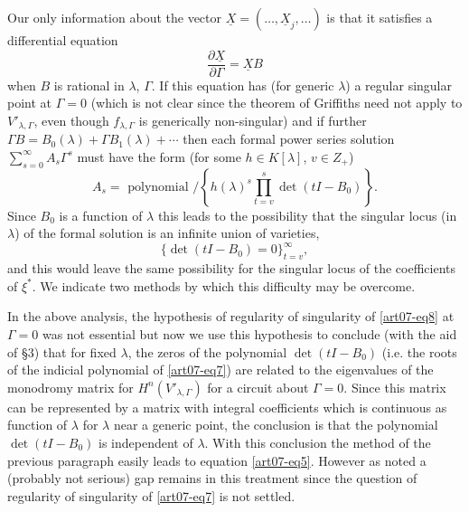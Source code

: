 Our only information about the vector $\underline{X}=(\ldots,\underline{X}_{j},\ldots)$ is that it satisfies a differential equation
\begin{equation}
\dfrac{\partial \underline{X}}{\partial \Gamma}=\underline{X}B\label{art07-eq8}
\end{equation}\pageoriginale
when $B$ is rational in $\lambda$, $\Gamma$. If this equation has (for generic $\lambda$) a regular singular point at $\Gamma=0$ (which is not clear since the theorem of Griffiths need not apply to $V'_{\lambda,\Gamma}$, even though $f_{\lambda,\Gamma}$ is generically non-singular) and if further $\Gamma B=B_{0}(\lambda)+\Gamma B_{1}(\lambda)+\cdots$ then each formal power series solution $\sum\limits^{\infty}_{s=0}A_{s}\Gamma^{s}$ must have the form (for some $h\in K[\lambda]$, $v\in Z_{+}$)
$$
A_{s}=\text{~polynomial~}/\left\{h(\lambda)^{s}\prod\limits^{s}_{t=v}\det (tI-B_{0})\right\}.
$$
Since $B_{0}$ is a function of $\lambda$ this leads to the possibility that the singular locus (in $\lambda$) of the formal solution is an infinite union of varieties,
$$
\{\det (tI-B_{0})=0\}^{\infty}_{t=v},
$$
and this would leave the same possibility for the singular locus of the coefficients of $\xi^{*}$. We indicate two methods by which this difficulty may be overcome.

\begin{method}\label{art07-method1}
In the above analysis, the hypothesis of regularity of singularity of \eqref{art07-eq8} at $\Gamma=0$ was not essential but now we use this hypothesis to conclude (with the aid of \S3) that for fixed $\lambda$, the zeros of the polynomial $\det(tI-B_{0})$ (i.e. the roots of the indicial polynomial of \eqref{art07-eq7}) are related to the eigenvalues of the monodromy matrix for $H^{n}(V'_{\lambda,\Gamma})$ for a circuit about $\Gamma=0$. Since this matrix can be represented by a matrix with integral coefficients which is continuous as function of $\lambda$ for $\lambda$ near a generic point, the conclusion is that the polynomial $\det (tI-B_{0})$ is independent of $\lambda$. With this conclusion the method of the previous paragraph easily leads to equation \eqref{art07-eq5}. However as noted a (probably not serious) gap remains in this treatment since the question of regularity of singularity of \eqref{art07-eq7} is not settled.
\end{method}

